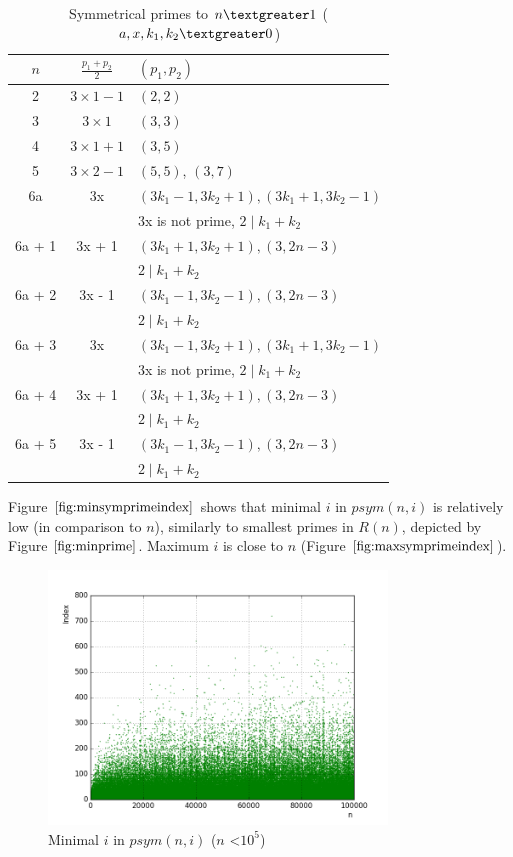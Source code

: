 \documentclass[10pt,twocolumn]{article}
\begin{document}
\begin{table}[ht]
\centering
\caption{Symmetrical primes to $n \textgreater 1$ ($a, x, k_1, k_2 \textgreater 0$)}
\label{tablesymprimes}
\begin{tabular}{|c|c|l|}
  \hline 
  \rowcolor{LightCyan}
  $n$ & $\frac{p_1+p_2}{2}$ & $(p_1, p_2)$ \\
  \hline 
  2 & $3 \times 1 - 1$ & $(2, 2)$ \\
  \hline 
  3 & $3 \times 1$ & $(3, 3)$ \\
  \hline 
  4 & $3 \times 1 + 1$ & $(3, 5)$ \\
  \hline
  5 & $3 \times 2 - 1$ & $(5, 5)$, $(3, 7)$ \\
  \hline
  6a & 3x & $(3k_1-1, 3k_2+1), (3k_1+1, 3k_2-1)$ \\
  & & 3x is not prime, $2 \mid k_1 + k_2$\\
  \hline 
  6a + 1 & 3x + 1 & $(3k_1+1, 3k_2+1), (3, 2n-3)$\\
  & & $2 \mid k_1 + k_2$\\
  \hline 
  6a + 2 & 3x - 1 & $(3k_1-1, 3k_2-1), (3, 2n-3)$ \\
  & & $2 \mid k_1 + k_2$\\
  \hline 
  6a + 3 & 3x & $(3k_1-1, 3k_2+1), (3k_1+1, 3k_2-1)$ \\
  & & 3x is not prime, $2 \mid k_1 + k_2$\\
  \hline 
  6a + 4 & 3x + 1 & $(3k_1+1, 3k_2+1), (3, 2n-3)$ \\
  & & $2 \mid k_1 + k_2$\\
  \hline 
  6a + 5 & 3x - 1 & $(3k_1-1, 3k_2-1), (3, 2n-3)$ \\
  & & $2 \mid k_1 + k_2$\\
  \hline 
\end{tabular} 
\end{table}

 Figure $\ref{fig:minsymprimeindex}$ shows that minimal $i$ in $psym(n, i)$ is relatively low (in comparison to $n$), similarly to smallest primes in $R(n)$, depicted by Figure $\ref{fig:minprime}$. Maximum $i$ is close to $n$ (Figure $\ref{fig:maxsymprimeindex}$). \par

\begin{figure}[!ht]
\centering
\includegraphics[width=9cm]{f_checkpoint_gap_min_index_sym_primes}
\caption{Minimal $i$ in $psym(n,i)$ ($n$ \textless $10^5$)}
\label{fig:minsymprimeindex}
\end{figure}
\end{document}
